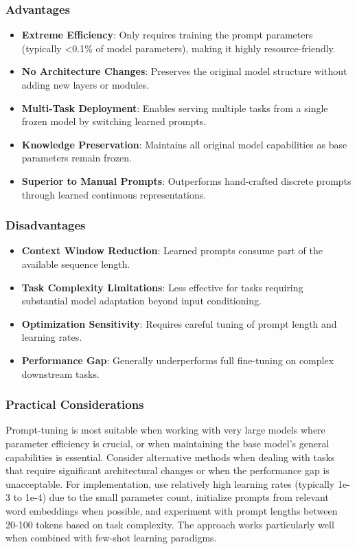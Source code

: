 \subsubsection{Advantages}
\begin{itemize}
    \item \textbf{Extreme Efficiency}: Only requires training the prompt parameters (typically <0.1\% of model parameters), making it highly resource-friendly.
    
    \item \textbf{No Architecture Changes}: Preserves the original model structure without adding new layers or modules.
    
    \item \textbf{Multi-Task Deployment}: Enables serving multiple tasks from a single frozen model by switching learned prompts.
    
    \item \textbf{Knowledge Preservation}: Maintains all original model capabilities as base parameters remain frozen.
    
    \item \textbf{Superior to Manual Prompts}: Outperforms hand-crafted discrete prompts through learned continuous representations.
\end{itemize}

\subsubsection{Disadvantages}
\begin{itemize}
    \item \textbf{Context Window Reduction}: Learned prompts consume part of the available sequence length.
    
    \item \textbf{Task Complexity Limitations}: Less effective for tasks requiring substantial model adaptation beyond input conditioning.
    
    \item \textbf{Optimization Sensitivity}: Requires careful tuning of prompt length and learning rates.
    
    \item \textbf{Performance Gap}: Generally underperforms full fine-tuning on complex downstream tasks.
\end{itemize}

\subsubsection{Practical Considerations}
Prompt-tuning is most suitable when working with very large models where parameter efficiency is crucial, or when maintaining the base model's general capabilities is essential. Consider alternative methods when dealing with tasks that require significant architectural changes or when the performance gap is unacceptable. For implementation, use relatively high learning rates (typically 1e-3 to 1e-4) due to the small parameter count, initialize prompts from relevant word embeddings when possible, and experiment with prompt lengths between 20-100 tokens based on task complexity. The approach works particularly well when combined with few-shot learning paradigms.


